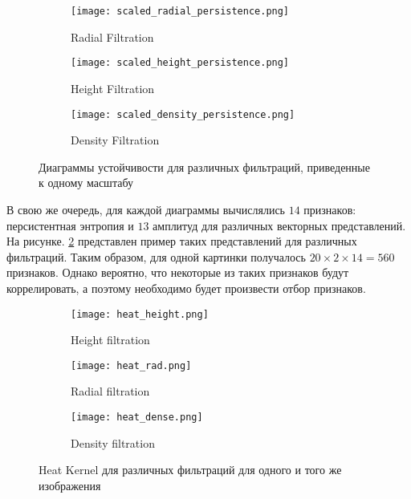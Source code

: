 \begin{figure}[!htbp]
	\begin{subfigure}{.33\textwidth}
		\centering
		\texttt{[image: scaled\_radial\_persistence.png]}\\
		\caption{Radial Filtration}
	\end{subfigure}%
	\begin{subfigure}{.33\textwidth}
		\centering
		\texttt{[image: scaled\_height\_persistence.png]}\\
		\caption{Height Filtration}
	\end{subfigure}%
	\begin{subfigure}{.33\textwidth}
		\centering
		\texttt{[image: scaled\_density\_persistence.png]}\\
		\caption{Density Filtration}
	\end{subfigure}%
	\caption{Диаграммы устойчивости для различных фильтраций, приведенные к одному масштабу}
	\label{scaled_persistences}
\end{figure}

В свою же очередь, для каждой диаграммы вычислялись $14$ признаков: персистентная энтропия и $13$ амплитуд для различных векторных представлений. На рисунке. \ref{representations} представлен пример таких представлений для различных фильтраций. Таким образом, для одной картинки получалось $20 \times 2 \times 14 = 560$ признаков. Однако вероятно, что некоторые из таких признаков будут коррелировать, а поэтому необходимо будет произвести отбор признаков.

\begin{figure}[!htbp]
	\begin{subfigure}{.33\textwidth}
		\centering
		\texttt{[image: heat\_height.png]}\\
		\caption{Height filtration}
	\end{subfigure}%
	\begin{subfigure}{.33\textwidth}
		\centering
		\texttt{[image: heat\_rad.png]}\\
		\caption{Radial filtration}
	\end{subfigure}%
	\begin{subfigure}{.33\textwidth}
		\centering
		\texttt{[image: heat\_dense.png]}\\
		\caption{Density filtration}
	\end{subfigure}%
	\caption{Heat Kernel для различных фильтраций для одного и того же изображения}
	\label{representations}
\end{figure}

